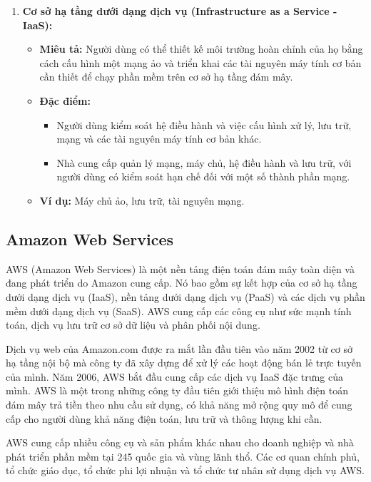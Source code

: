 \begin{enumerate}
    \item \textbf{Cơ sở hạ tầng dưới dạng dịch vụ (Infrastructure as a Service - IaaS):}
    \begin{itemize}
        \item \textbf{Miêu tả:} Người dùng có thể thiết kế môi trường hoàn chỉnh của họ bằng cách cấu hình một mạng ảo và triển khai các tài nguyên máy tính cơ bản cần thiết để chạy phần mềm trên cơ sở hạ tầng đám mây.
        \item \textbf{Đặc điểm:}
        \begin{itemize}
            \item Người dùng kiểm soát hệ điều hành và việc cấu hình xử lý, lưu trữ, mạng và các tài nguyên máy tính cơ bản khác.
            \item Nhà cung cấp quản lý mạng, máy chủ, hệ điều hành và lưu trữ, với người dùng có kiểm soát hạn chế đối với một số thành phần mạng.
        \end{itemize}
        \item \textbf{Ví dụ:} Máy chủ ảo, lưu trữ, tài nguyên mạng.
    \end{itemize}
\end{enumerate}

\subsection{Amazon Web Services}
AWS (Amazon Web Services) là một nền tảng điện toán đám mây toàn diện và đang phát triển do Amazon cung cấp. Nó bao gồm sự kết hợp của cơ sở hạ tầng dưới dạng dịch vụ (IaaS), nền tảng dưới dạng dịch vụ (PaaS) và các dịch vụ phần mềm dưới dạng dịch vụ (SaaS). AWS cung cấp các công cụ như sức mạnh tính toán, dịch vụ lưu trữ cơ sở dữ liệu và phân phối nội dung.

Dịch vụ web của Amazon.com được ra mắt lần đầu tiên vào năm 2002 từ cơ sở hạ tầng nội bộ mà công ty đã xây dựng để xử lý các hoạt động bán lẻ trực tuyến của mình. Năm 2006, AWS bắt đầu cung cấp các dịch vụ IaaS đặc trưng của mình. AWS là một trong những công ty đầu tiên giới thiệu mô hình điện toán đám mây trả tiền theo nhu cầu sử dụng, có khả năng mở rộng quy mô để cung cấp cho người dùng khả năng điện toán, lưu trữ và thông lượng khi cần.

AWS cung cấp nhiều công cụ và sản phẩm khác nhau cho doanh nghiệp và nhà phát triển phần mềm tại 245 quốc gia và vùng lãnh thổ. Các cơ quan chính phủ, tổ chức giáo dục, tổ chức phi lợi nhuận và tổ chức tư nhân sử dụng dịch vụ AWS.

